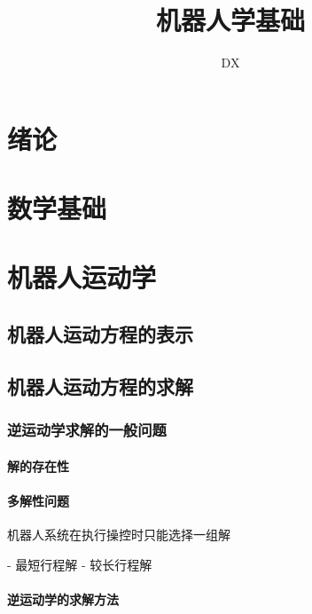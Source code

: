 \documentclass[11pt]{book}
\begin{document}
    \begin{titlepage}
        \title{机器人学基础}
        \author{DX}
        \maketitle
    \end{titlepage}
    \tableofcontents

    \chapter{绪论}

    \chapter{数学基础}

    \chapter{机器人运动学}

    \section{机器人运动方程的表示}

    \section{机器人运动方程的求解}

    \subsection{逆运动学求解的一般问题}

    \subsubsection{解的存在性}

    \subsubsection{多解性问题}


    机器人系统在执行操控时只能选择一组解
    
    - 最短行程解
    - 较长行程解
    
    \subsubsection{逆运动学的求解方法}
\end{document}
